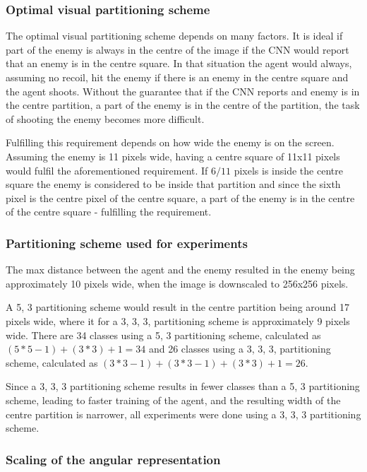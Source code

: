 \subsubsection{Optimal visual partitioning scheme}
The optimal visual partitioning scheme depends on many factors. It is ideal if part of the enemy is always in the centre of the image if the CNN would report that an enemy is in the centre square. In that situation the agent would always, assuming no recoil, hit the enemy if there is an enemy in the centre square and the agent shoots. Without the guarantee that if the CNN reports and enemy is in the centre partition, a part of the enemy is in the centre of the partition, the task of shooting the enemy becomes more difficult.

Fulfilling this requirement depends on how wide the enemy is on the screen. Assuming the enemy is 11 pixels wide, having a centre square of 11x11 pixels would fulfil the aforementioned requirement. If $6/11$ pixels is inside the centre square the enemy is considered to be inside that partition and since the sixth pixel is the centre pixel of the centre square, a part of the enemy is in the centre of the centre square - fulfilling the requirement.

\subsubsection{Partitioning scheme used for experiments}
The max distance between the agent and the enemy resulted in the enemy being approximately 10 pixels wide, when the image is downscaled to 256x256 pixels.

A 5, 3 partitioning scheme would result in the centre partition being around 17 pixels wide, where it for a 3, 3, 3, partitioning scheme is approximately 9 pixels wide. There are 34 classes using a 5, 3 partitioning scheme, calculated as $(5*5-1)+(3*3)+1=34$ and 26 classes using a 3, 3, 3, partitioning scheme, calculated as $(3*3-1)+(3*3-1)+(3*3)+1=26$.

Since a 3, 3, 3 partitioning scheme results in fewer classes than a 5, 3 partitioning scheme, leading to faster training of the agent, and the resulting width of the centre partition is narrower, all experiments were done using a 3, 3, 3 partitioning scheme.

\subsubsection{Scaling of the angular representation}

